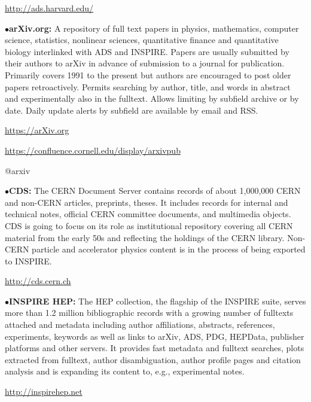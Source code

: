        \item{}\qquad\url{http://ads.harvard.edu/}

\medskip

\item{$\bullet$}{\bf arXiv.org:}
A repository of full text papers in physics, mathematics, computer science, statistics, nonlinear sciences, quantitative finance and quantitative biology interlinked with ADS and INSPIRE. Papers are usually submitted by their authors to arXiv in advance of submission to a journal for publication. Primarily covers 1991 to the present but authors are encouraged to post older papers retroactively. Permits searching by author, title, and words in abstract and experimentally also in the fulltext. Allows limiting by subfield archive or by date. Daily update alerts by subfield are available by email and RSS.

	\item{}\qquad\url{https://arXiv.org}
	\item{} \url{https://confluence.cornell.edu/display/arxivpub}
	\item{} @arxiv
\medskip

\item{$\bullet$}{\bf CDS:}
The CERN Document Server contains records of about 1,000,000 CERN and non-CERN articles, preprints, theses. It includes records for internal and technical notes, official CERN committee documents, and multimedia objects. CDS is going to focus on its role as institutional repository covering all CERN material from the early 50s and reflecting the holdings of the CERN library. Non-CERN particle and accelerator physics content is in the process of being exported to INSPIRE.

      \item{}\qquad\url{http://cds.cern.ch}
\medskip

\item{$\bullet$}{\bf INSPIRE HEP:} 
The HEP collection, the flagship of the INSPIRE suite, serves more than 1.2 million bibliographic records with a growing number of fulltexts attached and metadata including author affiliations, abstracts, references, experiments, keywords as well as links to arXiv, ADS, PDG, HEPData, publisher platforms and other servers. It provides fast metadata and fulltext searches, plots extracted from fulltext, author disambiguation, author profile pages and citation analysis and is expanding its content to, e.g., experimental notes.

   \item{}\qquad\url{http://inspirehep.net}
\medskip


